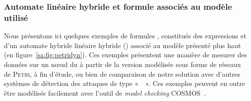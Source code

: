         \subsubsection{Automate linéaire hybride et formule \lsah associés au modèle utilisé}
Nous présentons ici quelques exemples de formules \lsah, constitués des expressions \lsah et d'un automate hybride linéaire hybride (\alh) associé au modèle \rpsge présenté plus haut (en figure~\ref{sa:fig:petridyn}).
Ces exemples présentent une manière de mesurer des données sur un nœud du \rc à partir de la version modélisée sous forme de réseaux de \textsc{Petri}, à fin d'étude, ou bien de comparaison de notre solution avec d'autres systèmes de détection des attaques de type «~\dds~».
Ces exemples peuvent en outre être modélisés facilement avec l'outil de \textit{model checking} \textsf{COSMOS}~\cite{BDDHP11cosmos}.

